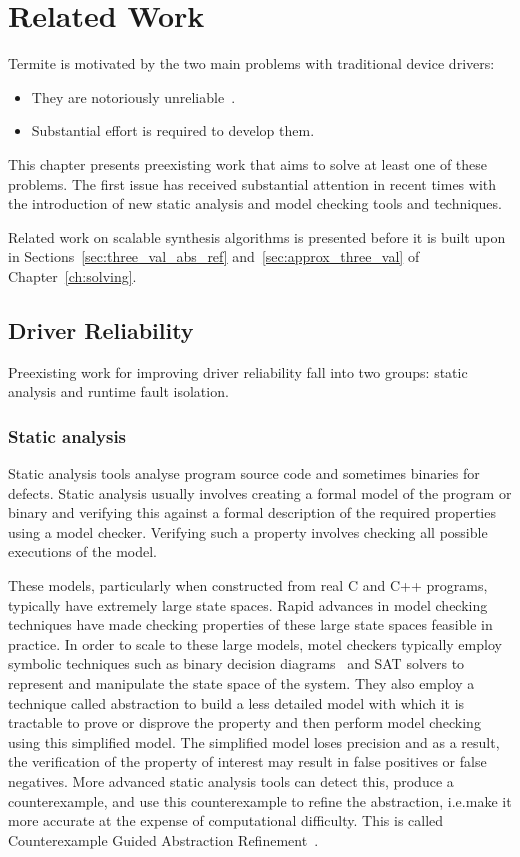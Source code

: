 \chapter{Related Work}
\label{ch:related}

Termite is motivated by the two main problems with traditional device drivers:

\begin{itemize}
    \item They are notoriously unreliable~\cite{Chou_YCHE_01,Ganapathi_GP_06}.
    \item Substantial effort is required to develop them.
\end{itemize}

This chapter presents preexisting work that aims to solve at least one of these problems. The first issue has received substantial attention in recent times with the introduction of new static analysis and model checking tools and techniques. 

Related work on scalable synthesis algorithms is presented before it is built upon in Sections~\ref{sec:three_val_abs_ref} and~\ref{sec:approx_three_val} of Chapter~\ref{ch:solving}.

\section{Driver Reliability}
Preexisting work for improving driver reliability fall into two groups: static analysis and runtime fault isolation.

\subsection{Static analysis}
Static analysis tools analyse program source code and sometimes binaries for defects. Static analysis usually involves creating a formal model of the program or binary and verifying this against a formal description of the required properties using a model checker. Verifying such a property involves checking all possible executions of the model.

These models, particularly when constructed from real C and C++ programs, typically have extremely large state spaces. Rapid advances in model checking techniques have made checking properties of these large state spaces feasible in practice. In order to scale to these large models, motel checkers typically employ symbolic techniques such as binary decision diagrams~\cite{Bryant_86} and SAT solvers to represent and manipulate the state space of the system. They also employ a technique called abstraction to build a less detailed model with which it is tractable to prove or disprove the property and then perform model checking using this simplified model. The simplified model loses precision and as a result, the verification of the property of interest may result in false positives or false negatives. More advanced static analysis tools can detect this, produce a counterexample, and use this counterexample to refine the abstraction, i.e.\@ make it more accurate at the expense of computational difficulty. This is called Counterexample Guided Abstraction Refinement~\cite{Clarke_GJLV_00}.

